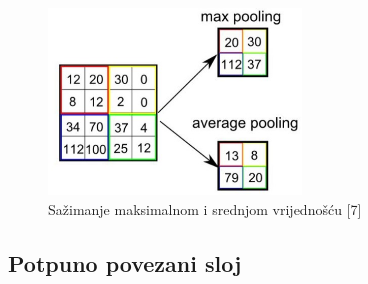 \documentclass[times, utf8, zavrsni]{fer}
\begin{document}
% 
\begin{figure}[!h]
\centering
\includegraphics[width=0.6\textwidth]{./slike/pooling1}
\caption{Sažimanje maksimalnom i srednjom vrijednošću [7]}
\label{fig:pooling1}
\end{figure}
%

\subsection*{Potpuno povezani sloj}
\end{document}
